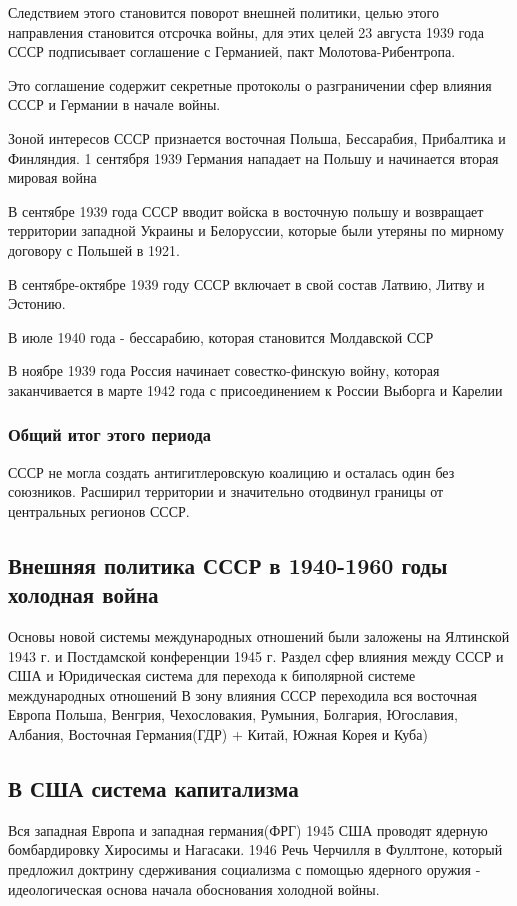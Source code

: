 \documentclass[a4paper]{article}
\begin{document}
Следствием этого становится поворот внешней политики, целью этого направления становится отсрочка войны, для этих целей 23 августа 1939 года СССР подписывает соглашение с Германией, пакт Молотова-Рибентропа.

Это соглашение содержит секретные протоколы о разграничении сфер влияния СССР и Германии в начале войны.

Зоной интересов СССР признается восточная Польша, Бессарабия, Прибалтика и Финляндия.
1 сентября 1939 Германия нападает на Польшу и начинается вторая мировая война

В сентябре 1939 года СССР вводит войска в восточную польшу и возвращает территории западной Украины и Белоруссии, которые были утеряны по мирному договору с Польшей в 1921.

В сентябре-октябре 1939 году СССР включает в свой состав Латвию, Литву и Эстонию.

В июле 1940 года - бессарабию, которая становится Молдавской ССР

В ноябре 1939 года Россия начинает совестко-финскую войну, которая заканчивается в марте 1942 года с присоединением к России Выборга и Карелии

\subsubsection{Общий итог этого периода}
СССР не могла создать антигитлеровскую коалицию и осталась один без союзников.
Расширил территории и значительно отодвинул границы от центральных регионов СССР.

\subsection{Внешняя политика СССР в 1940-1960 годы холодная война}
Основы новой системы международных отношений были заложены на Ялтинской 1943 г. и Постдамской конференции 1945 г.
Раздел сфер влияния между СССР и США и Юридическая система для перехода к биполярной системе международных отношений
В зону влияния СССР переходила вся восточная Европа Польша, Венгрия, Чехословакия, Румыния, Болгария, Югославия, Албания, Восточная Германия(ГДР) + Китай, Южная Корея и Куба)

\subsection{В США система капитализма}
Вся западная Европа и западная германия(ФРГ)
1945 США проводят ядерную бомбардировку Хиросимы и Нагасаки.
1946 Речь Черчилля в Фуллтоне, который предложил доктрину сдерживания социализма с помощью ядерного оружия - идеологическая основа начала обоснования холодной войны.
\end{document}
